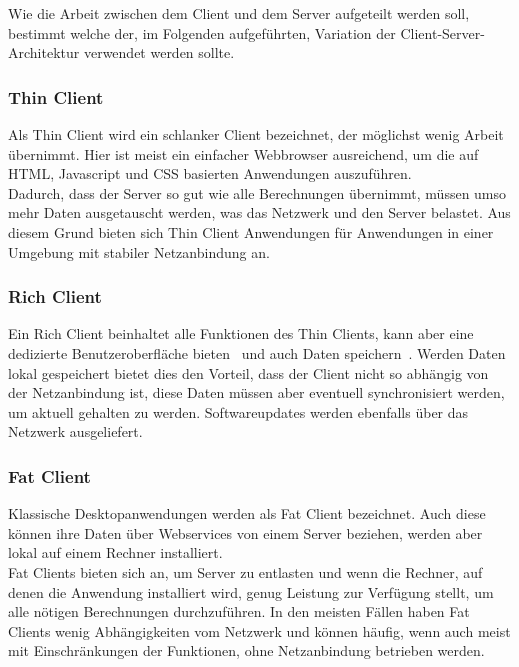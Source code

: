 
Wie die Arbeit zwischen dem Client und dem Server aufgeteilt werden soll, bestimmt welche der, im Folgenden aufgeführten, Variation der Client-Server-Architektur verwendet werden sollte.
\subsubsection{Thin Client} %
\label{ssub:Thin Client}
Als Thin Client wird ein schlanker Client bezeichnet, der möglichst wenig Arbeit übernimmt.
Hier ist meist ein einfacher Webbrowser ausreichend, um die auf HTML, Javascript und CSS basierten Anwendungen auszuführen.~\cite{WebarchitekturenOnline}\\
Dadurch, dass der Server so gut wie alle Berechnungen übernimmt, müssen umso mehr Daten ausgetauscht werden, was das Netzwerk und den Server belastet.
Aus diesem Grund bieten sich Thin Client Anwendungen für Anwendungen in einer Umgebung mit stabiler Netzanbindung an.

\subsubsection{Rich Client} %
\label{ssub:Richt Client}
Ein Rich Client beinhaltet alle Funktionen des Thin Clients, kann aber eine dedizierte Benutzeroberfläche bieten~\cite{WebarchitekturenOnline} und auch Daten speichern~\cite{softArchGrundl}.
Werden Daten lokal gespeichert bietet dies den Vorteil, dass der Client nicht so abhängig von der Netzanbindung ist, diese Daten müssen aber eventuell synchronisiert werden, um aktuell gehalten zu werden.
Softwareupdates werden ebenfalls über das Netzwerk ausgeliefert.~\cite{softArchGrundl} %

\subsubsection{Fat Client} %
\label{ssub:Fat Client}
Klassische Desktopanwendungen werden als Fat Client bezeichnet.
Auch diese können ihre Daten über Webservices von einem Server beziehen, werden aber lokal auf einem Rechner installiert.~\cite{WebarchitekturenOnline}\\
Fat Clients bieten sich an, um Server zu entlasten und wenn die Rechner, auf denen die Anwendung installiert wird, genug Leistung zur Verfügung stellt, um alle nötigen Berechnungen durchzuführen.
In den meisten Fällen haben Fat Clients wenig Abhängigkeiten vom Netzwerk und können häufig, wenn auch meist mit Einschränkungen der Funktionen, ohne Netzanbindung betrieben werden.

